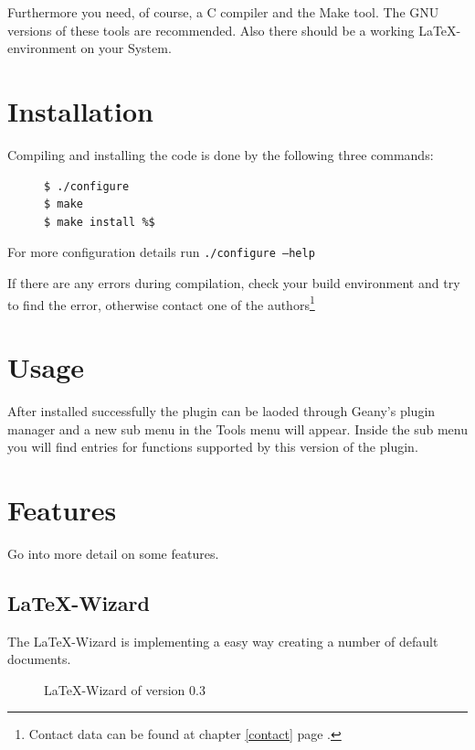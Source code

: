 \documentclass[/%
a4paper,%
10pt,%
oneside,%
DIV18,
headsepline,         %
plainheadsepline,
footsepline,         %
plainfootsepline,
bibtotoc,%
liststotoc,%
BCOR12mm,%
halfparskip,%
openany,%
]{scrartcl}
\begin{document}
Furthermore you need, of course, a C compiler and the Make tool. The
GNU versions of these tools are recommended. Also there should be a
working \LaTeX-environment on your System.


\section{Installation}
Compiling and installing the code is done by the following three
commands:

\begin{figure}[h!]
\begin{lstlisting}
$ ./configure
$ make
$ make install %$
\end{lstlisting}
\end{figure}

For more configuration details run \texttt{./configure --help}

If there are any errors during compilation, check your build environment
and try to find the error, otherwise contact one of the authors\footnote{Contact data can be found at chapter \ref{contact} page \pageref{contact}.}

\section{Usage}

After installed successfully the plugin can be laoded through
Geany's plugin manager and a new sub menu in the Tools menu
will appear. Inside the sub menu you will find entries for
functions supported by this version of the plugin.


\section{Features}

Go into more detail on some features.

\subsection{\LaTeX-Wizard}

The \LaTeX-Wizard is implementing a easy way creating a number of
default documents.
\begin{figure}[h!]
	\caption{\LaTeX-Wizard of version 0.3}
\end{figure}
\end{document}
